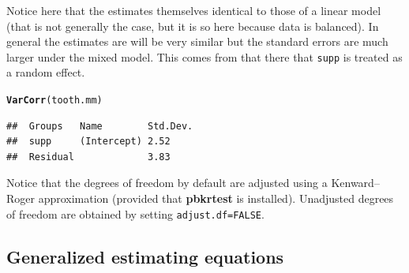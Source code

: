 \documentclass[10pt]{article}\usepackage[]{graphicx}\usepackage[]{color}
\makeatletter
\newcommand{\hlstd}[1]{\textcolor[rgb]{0.345,0.345,0.345}{#1}}%
\newcommand{\hlkwd}[1]{\textcolor[rgb]{0.737,0.353,0.396}{\textbf{#1}}}%
\newenvironment{kframe}{%
 \def\at@end@of@kframe{}%
 \ifinner\ifhmode%
  \def\at@end@of@kframe{\end{minipage}}%
  \begin{minipage}{\columnwidth}%
 \fi\fi%
 \def\FrameCommand##1{\hskip\@totalleftmargin \hskip-\fboxsep
 \colorbox{shadecolor}{##1}\hskip-\fboxsep
     \hskip-\linewidth \hskip-\@totalleftmargin \hskip\columnwidth}%
 \MakeFramed {\advance\hsize-\width
   \@totalleftmargin\z@ \linewidth\hsize
   \@setminipage}}%
 {\par\unskip\endMakeFramed%
 \at@end@of@kframe}
\newenvironment{knitrout}{}{} %
\def\pkg#1{{\bf #1}}
\def\code#1{\texttt{#1}}
\makeatother
\begin{document}
Notice here that the estimates themselves identical to those of a
linear model (that is not generally the case, but it is so here
because data is balanced). In general the estimates are will be 
very similar but the standard errors are much larger under the mixed model.
This comes from that
there that \code{supp} is treated as a random effect.

\begin{knitrout}
\color{fgcolor}\begin{kframe}
\begin{alltt}
\hlkwd{VarCorr}\hlstd{(tooth.mm)}
\end{alltt}
\begin{verbatim}
##  Groups   Name        Std.Dev.
##  supp     (Intercept) 2.52    
##  Residual             3.83
\end{verbatim}
\end{kframe}
\end{knitrout}

Notice that the degrees of freedom by default are adjusted using a
Kenward--Roger approximation (provided that \pkg{pbkrtest} is
installed). Unadjusted degrees of freedom are obtained by setting \verb|adjust.df=FALSE|. 



\subsection{Generalized estimating equations}
\label{sec:gener-estim-equat}
\end{document}
